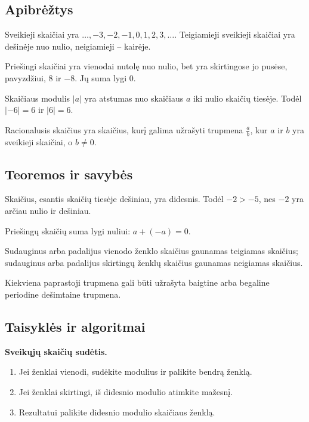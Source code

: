 \subsection{Apibrėžtys}
\begin{apibreztis}
Sveikieji skaičiai yra \(\ldots,-3,-2,-1,0,1,2,3,\ldots\). Teigiamieji sveikieji skaičiai yra dešinėje nuo nulio, neigiamieji -- kairėje.
\end{apibreztis}
\begin{apibreztis}
Priešingi skaičiai yra vienodai nutolę nuo nulio, bet yra skirtingose jo pusėse, pavyzdžiui, \(8\) ir \(-8\). Jų suma lygi \(0\).
\end{apibreztis}
\begin{apibreztis}
Skaičiaus modulis \(|a|\) yra atstumas nuo skaičiaus \(a\) iki nulio skaičių tiesėje. Todėl \(|-6|=6\) ir \(|6|=6\).
\end{apibreztis}
\begin{apibreztis}
Racionalusis skaičius yra skaičius, kurį galima užrašyti trupmena \(\frac{a}{b}\), kur \(a\) ir \(b\) yra sveikieji skaičiai, o \(b\ne 0\).
\end{apibreztis}

\subsection{Teoremos ir savybės}
\begin{savybe}
Skaičius, esantis skaičių tiesėje dešiniau, yra didesnis. Todėl \(-2>-5\), nes \(-2\) yra arčiau nulio ir dešiniau.
\end{savybe}
\begin{savybe}
Priešingų skaičių suma lygi nuliui: \(a+(-a)=0\).
\end{savybe}
\begin{savybe}
Sudauginus arba padalijus vienodo ženklo skaičius gaunamas teigiamas skaičius; sudauginus arba padalijus skirtingų ženklų skaičius gaunamas neigiamas skaičius.
\end{savybe}
\begin{savybe}
Kiekviena paprastoji trupmena gali būti užrašyta baigtine arba begaline periodine dešimtaine trupmena.
\end{savybe}

\subsection{Taisyklės ir algoritmai}
\textbf{Sveikųjų skaičių sudėtis.}
\begin{enumerate}[label=\arabic*.]
\item Jei ženklai vienodi, sudėkite modulius ir palikite bendrą ženklą.
\item Jei ženklai skirtingi, iš didesnio modulio atimkite mažesnį.
\item Rezultatui palikite didesnio modulio skaičiaus ženklą.
\end{enumerate}

